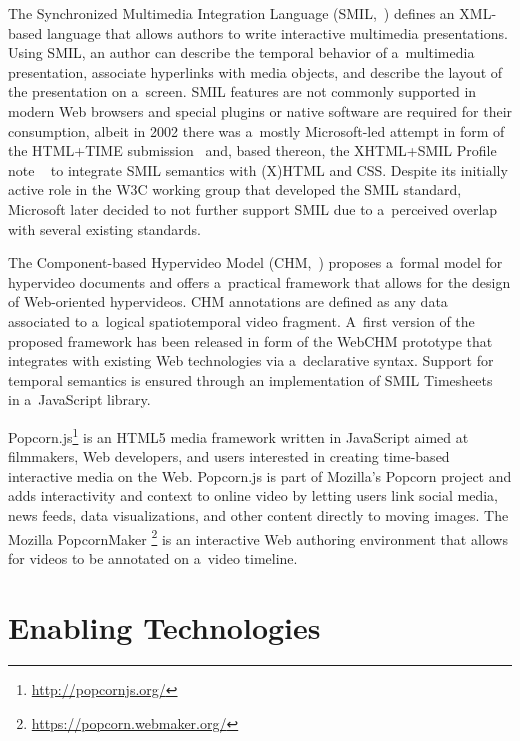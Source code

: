 \documentclass{sig-alternate}
\newcommand{\inlinelistingsize}{\fontsize{8pt}{11pt}}
\let\oldurl\url
\renewcommand{\url}[1]{\inlinelistingsize\oldurl{#1}}
\begin{document}
The Synchronized Multimedia Integration Language\linebreak
(SMIL,~\cite{bulterman2006smil})
defines an XML-based language that allows authors
to write interactive multimedia presentations.
Using SMIL, an author can describe the temporal behavior
of a~multimedia presentation, associate hyperlinks
with media objects, and describe the layout
of the presentation on a~screen.
SMIL features are not commonly supported 
in modern Web browsers and special plugins or native software
are required for their consumption,
albeit in 2002 there was a~mostly Microsoft-led attempt
in form of the HTML+TIME submission~\cite{schmitz1998htmltime}
and, based thereon, the XHTML+SMIL Profile note%
~\cite{newman2002xhtmlsmil}
to integrate SMIL semantics with (X)HTML and CSS.
Despite its initially active role in the W3C working group
that developed the SMIL standard,
Microsoft later decided to not further support SMIL
due to a~perceived overlap with several existing standards.

The Component-based Hypervideo Model
(CHM,~\cite{sadallah2012hypervideo})
proposes a~formal model for hypervideo documents
and offers a~practical framework that allows for
the design of Web-oriented hypervideos.
CHM annotations are defined as any data associated to
a~logical spatiotemporal video fragment.
A~first version of the proposed framework
has been released in form of the WebCHM prototype
that integrates with existing Web technologies
via a~declarative syntax.
Support for temporal semantics is ensured through  
an implementation of SMIL Timesheets~\cite{vuorimaa2012timesheets}
in a~JavaScript library.

Popcorn.js\footnote{\url{http://popcornjs.org/}}
is an HTML5 media framework written in JavaScript
aimed at filmmakers, Web developers,
and users interested in creating
time-based interactive media on the Web.
Popcorn.js is part of Mozilla's Popcorn project
and adds interactivity and context to online video
by letting users link social media, news feeds,
data visualizations, and other content directly to moving images.
The Mozilla PopcornMaker%
\footnote{\url{https://popcorn.webmaker.org/}}
is an interactive Web authoring environment
that allows for videos to be annotated on a~video timeline.

\section{Enabling Technologies}
\end{document}
